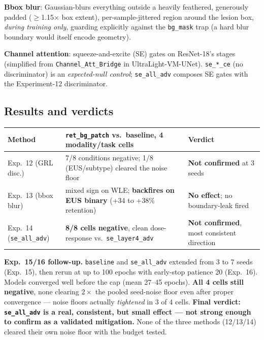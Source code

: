 \documentclass[10pt]{article}
\newcommand{\unconf}{\textcolor{unconfamber}{\textbf{Not confirmed}}}
\newcommand{\noeffect}{\textcolor{unconfamber}{\textbf{No effect}}}
\begin{document}
\textbf{Bbox blur}: Gaussian-blurs everything outside a heavily feathered, generously padded ($\geq$1.15$\times$
box extent), per-sample-jittered region around the lesion box, \emph{during training only}, guarding
explicitly against the \texttt{bg\_mask} trap (a hard blur boundary would itself encode geometry).

\textbf{Channel attention}: squeeze-and-excite (SE) gates on ResNet-18's stages (simplified from
\texttt{Channel\_Att\_Bridge} in UltraLight-VM-UNet). \texttt{se\_*\_ce} (no discriminator) is an
\emph{expected-null control}; \texttt{se\_all\_adv} composes SE gates with the Experiment-12 discriminator.

\subsection{Results and verdicts}

\begin{center}
\begin{tabular}{L{2.1cm}L{7.6cm}L{4.4cm}}
\toprule
\textbf{Method} & \textbf{\texttt{ret\_bg\_patch} vs.\ baseline, 4 modality/task cells} & \textbf{Verdict} \\
\midrule
Exp.\ 12 (GRL disc.) & 7/8 conditions negative; 1/8 (EUS/subtype) cleared the noise floor & \unconf{} at 3 seeds \\
Exp.\ 13 (bbox blur) & mixed sign on WLE; \textbf{backfires on EUS binary} (+34 to +38\% retention) & \noeffect{}; no boundary-leak fired \\
Exp.\ 14 (\texttt{se\_all\_adv}) & \textbf{8/8 cells negative}, clean dose-response vs.\ \texttt{se\_layer4\_adv} & \unconf{}, most consistent direction \\
\bottomrule
\end{tabular}
\end{center}

\textbf{Exp.\ 15/16 follow-up.} \texttt{baseline} and \texttt{se\_all\_adv} extended from 3 to 7 seeds (Exp.\
15), then rerun at up to 100 epochs with early-stop patience 20 (Exp.\ 16). Models converged well before the
cap (mean 27--45 epochs). \textbf{All 4 cells still negative}, none clearing $2\times$ the pooled seed-noise
floor even after proper convergence --- noise floors actually \emph{tightened} in 3 of 4 cells. \textbf{Final
verdict: \texttt{se\_all\_adv} is a real, consistent, but small effect --- not strong enough to confirm as a
validated mitigation.} None of the three methods (12/13/14) cleared their own noise floor with the budget
tested.
\end{document}
